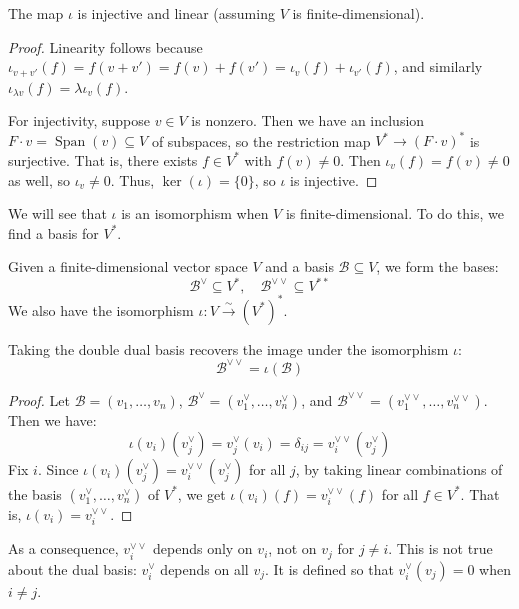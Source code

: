 \documentclass[../linear_algebra_and_groups.tex]{subfiles}
\begin{document}
\begin{proposition}
    \begin{shaded*}
    The map $\iota$ is injective and linear (assuming $V$ is finite-dimensional).
    \end{shaded*}
\end{proposition}
\begin{proof}
    Linearity follows because $\iota_{v+v'}(f) = f(v+v') = f(v) + f(v') = \iota_v(f) + \iota_{v'}(f)$, and similarly $\iota_{\lambda v}(f) = \lambda \iota_v(f)$.
    
    For injectivity, suppose $v \in V$ is nonzero. Then we have an inclusion $F \cdot v = \operatorname{Span}(v) \subseteq V$ of subspaces, so the restriction map $V^* \to (F \cdot v)^*$ is surjective. That is, there exists $f \in V^*$ with $f(v) \ne 0$. Then $\iota_v(f) = f(v) \ne 0$ as well, so $\iota_v \ne 0$. Thus, $\ker(\iota) = \{0\}$, so $\iota$ is injective.
    \qedhere
\end{proof}

We will see that $\iota$ is an isomorphism when $V$ is finite-dimensional. To do this, we find a basis for $V^*$.

Given a finite-dimensional vector space $V$ and a basis $\mathcal{B} \subseteq V$, we form the bases:
\[ \mathcal{B}^\vee \subseteq V^*, \quad \mathcal{B}^{\vee\vee} \subseteq V^{**} \]
We also have the isomorphism $\iota : V \xrightarrow{\sim} (V^*)^*$.

\begin{proposition}
    \begin{shaded*}
    Taking the double dual basis recovers the image under the isomorphism $\iota$:
    \[ \mathcal{B}^{\vee\vee} = \iota(\mathcal{B}) \]
    \end{shaded*}
\end{proposition}
\begin{proof}
    Let $\mathcal{B} = (v_1, \dots, v_n)$, $\mathcal{B}^\vee = (v_1^\vee, \dots, v_n^\vee)$, and $\mathcal{B}^{\vee\vee} = (v_1^{\vee\vee}, \dots, v_n^{\vee\vee})$. Then we have:
    \[ \iota(v_i)(v_j^\vee) = v_j^\vee(v_i) = \delta_{ij} = v_i^{\vee\vee}(v_j^\vee) \]
    Fix $i$. Since $\iota(v_i)(v_j^\vee) = v_i^{\vee\vee}(v_j^\vee)$ for all $j$, by taking linear combinations of the basis $(v_1^\vee, \dots, v_n^\vee)$ of $V^*$, we get $\iota(v_i)(f) = v_i^{\vee\vee}(f)$ for all $f \in V^*$. That is, $\iota(v_i) = v_i^{\vee\vee}$.
    \qedhere
\end{proof}

As a consequence, $v_i^{\vee\vee}$ depends only on $v_i$, not on $v_j$ for $j \ne i$. This is not true about the dual basis: $v_i^\vee$ depends on all $v_j$. It is defined so that $v_i^\vee(v_j) = 0$ when $i \ne j$.
\end{document}
